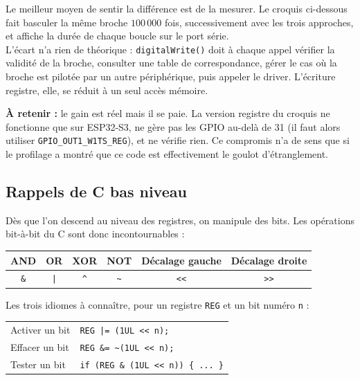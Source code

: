 Le meilleur moyen de sentir la différence est de la mesurer. Le croquis ci-dessous fait basculer la même broche $100\,000$ fois, successivement avec les trois approches, et affiche la durée de chaque boucle sur le port série.\\

L'écart n'a rien de théorique : \texttt{digitalWrite()} doit à chaque appel vérifier la validité de la broche, consulter une table de correspondance, gérer le cas où la broche est pilotée par un autre périphérique, puis appeler le driver. L'écriture registre, elle, se réduit à un seul accès mémoire.


\begin{imp}
\textbf{À retenir :} le gain est réel mais il se paie. La version registre du croquis ne fonctionne que sur ESP32-S3, ne gère pas les GPIO au-delà de 31 (il faut alors utiliser \texttt{GPIO\_OUT1\_W1TS\_REG}), et ne vérifie rien. Ce compromis n'a de sens que si le profilage a montré que ce code est effectivement le goulot d'étranglement.
\end{imp}

\subsection{Rappels de C bas niveau}

Dès que l'on descend au niveau des registres, on manipule des bits. Les opérations bit-à-bit du C sont donc incontournables :

\begin{center}
\begin{tabular}{|c|c|c|c|c|c|}
\hline
AND & OR & XOR & NOT & Décalage gauche & Décalage droite \\
\hline
\texttt{\&} & \texttt{|} & \texttt{\^{}} & \texttt{\~{}} & \texttt{<<} & \texttt{>>} \\
\hline
\end{tabular}
\end{center}

Les trois idiomes à connaître, pour un registre \texttt{REG} et un bit numéro \texttt{n} :

\begin{center}
\begin{tabular}{ll}
Activer un bit  & \texttt{REG |= (1UL << n);} \\
Effacer un bit  & \texttt{REG \&= \~{}(1UL << n);} \\
Tester un bit   & \texttt{if (REG \& (1UL << n)) \{ ... \}} \\
\end{tabular}
\end{center}


